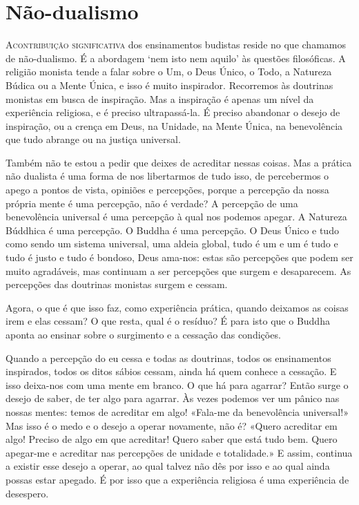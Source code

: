 \chapter{Não-dualismo}

\lettrine{A}{\space contribuição significativa} dos ensinamentos budistas reside
no que chamamos de não-dualismo. É a abordagem `nem isto nem aquilo' às
questões filosóficas. A religião monista tende a falar sobre o Um, o Deus Único,
o Todo, a Natureza Búdica ou a Mente Única, e isso é muito inspirador.
Recorremos às doutrinas monistas em busca de inspiração. Mas a inspiração é
apenas um nível da experiência religiosa, e é preciso ultrapassá-la. É preciso
abandonar o desejo de inspiração, ou a crença em Deus, na Unidade, na Mente
Única, na benevolência que tudo abrange ou na justiça universal.

Também não te estou a pedir que deixes de acreditar nessas coisas. Mas a prática
não dualista é uma forma de nos libertarmos de tudo isso, de percebermos o apego
a pontos de vista, opiniões e percepções, porque a percepção da nossa própria
mente é uma percepção, não é verdade? A percepção de uma benevolência universal
é uma percepção à qual nos podemos apegar. A Natureza Búddhica é uma percepção.
O Buddha é uma percepção. O Deus Único e tudo como sendo um sistema universal,
uma aldeia global, tudo é um e um é tudo e tudo é justo e tudo é bondoso, Deus
ama-nos: estas são percepções que podem ser muito agradáveis, mas continuam a
ser percepções que surgem e desaparecem. As percepções das doutrinas monistas
surgem e cessam.

Agora, o que é que isso faz, como experiência prática, quando deixamos as coisas
irem e elas cessam? O que resta, qual é o resíduo? É para isto que o Buddha
aponta ao ensinar sobre o surgimento e a cessação das condições.

Quando a percepção do eu cessa e todas as doutrinas, todos os ensinamentos
inspirados, todos os ditos sábios cessam, ainda há quem conhece a cessação. E
isso deixa-nos com uma mente em branco. O que há para agarrar? Então surge o
desejo de saber, de ter algo para agarrar. Às vezes podemos ver um pânico nas
nossas mentes: temos de acreditar em algo! «Fala-me da benevolência universal!»
Mas isso é o medo e o desejo a operar novamente, não é? «Quero acreditar em
algo! Preciso de algo em que acreditar! Quero saber que está tudo bem. Quero
apegar-me e acreditar nas percepções de unidade e totalidade.» E assim,
continua a existir esse desejo a operar, ao qual talvez não dês por isso e ao
qual ainda possas estar apegado. É por isso que a experiência religiosa é uma
experiência de desespero.

